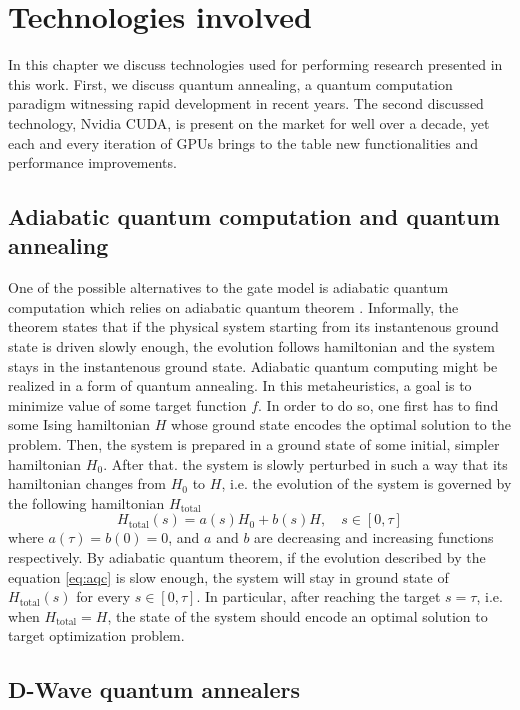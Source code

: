 \chapter{Technologies involved}
\label{chapter:near-term}

 In this chapter we discuss technologies used for performing research presented in this work.
 First, we discuss quantum annealing, a quantum computation paradigm witnessing rapid development in recent years. The second discussed technology, Nvidia CUDA, is present on the market for well over a decade, yet each and every iteration of GPUs brings to the table new functionalities and performance improvements. 


\section{Adiabatic quantum computation and quantum annealing}
One of the possible alternatives to the gate model is adiabatic quantum computation which relies on adiabatic quantum theorem \cite{born}. Informally, the theorem states that if the physical system starting from its instantenous ground state is driven slowly enough, the evolution follows hamiltonian and the system stays in the instantenous ground state. Adiabatic quantum computing might be realized in a form of quantum annealing. In this metaheuristics, a goal is to minimize value of some target function $f$. In order to do so, one first has to find some Ising hamiltonian $H$ whose ground state encodes the optimal solution to the problem. Then, the system is prepared in a ground state of some initial, simpler hamiltonian $H_0$. After that. the system is slowly perturbed in such a way that its hamiltonian changes from $H_0$ to $H$, i.e. the evolution of the system is governed by the following hamiltonian $H_\text{total}$
\begin{equation}
    \label{eq:aqc}
    {H}_\text{total}(s) = a(s) {H}_0 + b(s){H}, \quad s \in [0, \tau]
\end{equation}
where $a(\tau) = b(0) = 0$, and $a$ and $b$ are decreasing and increasing functions respectively.
By adiabatic quantum theorem, if the evolution described by the equation \eqref{eq:aqc} is slow enough, the system will stay in ground state of ${H}_\text{total}(s)$ for every $s \in [0, \tau]$. In particular, after reaching the target $s=\tau$, i.e. when $H_\text{total} = H$, the state of the system should encode an optimal solution to target optimization problem.


\section{D-Wave quantum annealers}

